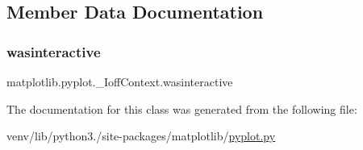 \subsection{Member Data Documentation}
\mbox{\label{classmatplotlib_1_1pyplot_1_1__IoffContext_ae3f197e917a82fe17abd55528db3af61}} 
\subsubsection{\texorpdfstring{wasinteractive}{wasinteractive}}
{\footnotesize\ttfamily matplotlib.\+pyplot.\+\_\+\+Ioff\+Context.\+wasinteractive}



The documentation for this class was generated from the following file\+:\begin{DoxyCompactItemize}
\item 
venv/lib/python3./site-\/packages/matplotlib/\hyperlink{pyplot_8py}{pyplot.\+py}\end{DoxyCompactItemize}
